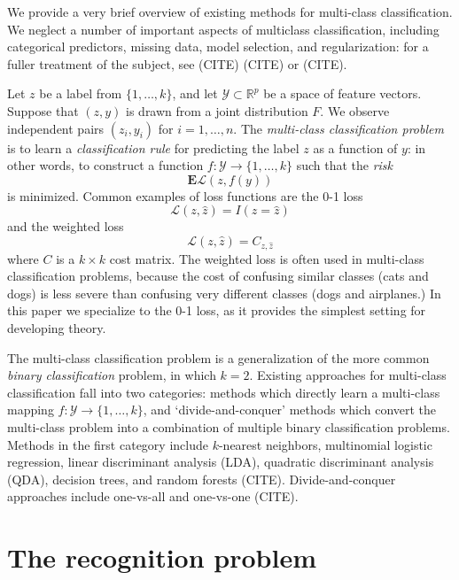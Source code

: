 \documentclass{article}
\newcommand{\E}{\textbf{E}}
\begin{document}
We provide a very brief overview of existing methods for multi-class classification.  We neglect a number of important
aspects of multiclass classification, including categorical predictors, missing data, model selection,
and regularization: for a fuller treatment of the subject, see (CITE) (CITE) or (CITE).

Let $z$ be a label from $\{1,\hdots,k\}$, and let $\mathcal{Y} \subset \mathbb{R}^p$
be a space of feature vectors.  Suppose that $(z, y)$ is drawn from a joint distribution $F$.
We observe independent pairs $(z_i, y_i)$ for $i = 1,\hdots, n$.
The \emph{multi-class classification problem} is to learn a \emph{classification rule}
for predicting the label $z$ as a function of $y$:
in other words, to construct a function $f:\mathcal{Y} \to \{1,\hdots, k\}$
such that the \emph{risk}
\[
\E \mathcal{L}(z, f(y))
\]
is minimized.
Common examples of loss functions are the 0-1 loss \[\mathcal{L}(z, \hat{z}) = I(z = \hat{z})\]
and the weighted loss
\[
\mathcal{L}(z, \hat{z}) = C_{z, \hat{z}}
\]
where $C$ is a $k \times k$ cost matrix.
The weighted loss is often used in multi-class classification problems, because the cost of confusing similar classes (cats and dogs)
is less severe than confusing very different classes (dogs and airplanes.)
In this paper we specialize to the 0-1 loss, as it provides the simplest setting for developing theory.

The multi-class classification problem is a generalization of the more common \emph{binary classification} problem,
in which $k = 2$.  Existing approaches for multi-class classification fall into two categories:
methods which directly learn a multi-class mapping $f: \mathcal{Y} \to \{1,\hdots, k\}$,
and `divide-and-conquer' methods which convert the multi-class problem into a combination of multiple binary
classification problems.  Methods in the first category include $k$-nearest neighbors, multinomial logistic regression, linear discriminant analysis (LDA), quadratic discriminant analysis (QDA), decision trees, and random forests (CITE).
Divide-and-conquer approaches include one-vs-all and one-vs-one (CITE).


\section{The recognition problem}
\end{document}
